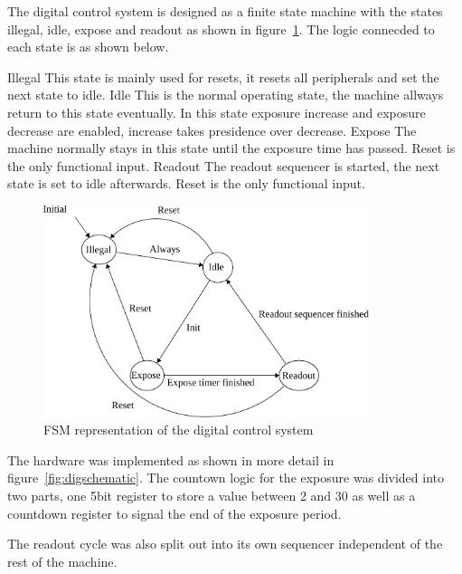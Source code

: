 The digital control system is designed as a finite state machine with the states illegal, idle, expose and readout as shown in figure~\ref{fig:fsmDiagram}.
The logic connecded to each state is as shown below.

\begin{outline}
  \1 Illegal
  \2 This state is mainly used for resets, it resets all peripherals and set the next state to idle.
  \1 Idle
  \2 This is the normal operating state, the machine allways return to this state eventually.
  \2 In this state exposure increase and exposure decrease are enabled, increase takes presidence over decrease.
  \1 Expose
  \2 The machine normally stays in this state until the exposure time has passed.
  \2 Reset is the only functional input.
  \1 Readout
  \2 The readout sequencer is started, the next state is set to idle afterwards.
  \2 Reset is the only functional input.
\end{outline}

\begin{figure}[htbp]
  \centering
  \includegraphics[width=0.85\textwidth]{figures/fsmDiagram}
  \caption{FSM representation of the digital control system}
  \label{fig:fsmDiagram}
\end{figure}

The hardware was implemented as shown in more detail in figure~\ref{fig:digschematic}.
The countown logic for the exposure was divided into two parts, one 5bit register to store a value between 2 and 30 as well as a countdown register
to signal the end of the exposure period.

The readout cycle was also split out into its own sequencer independent of the rest of the machine.

